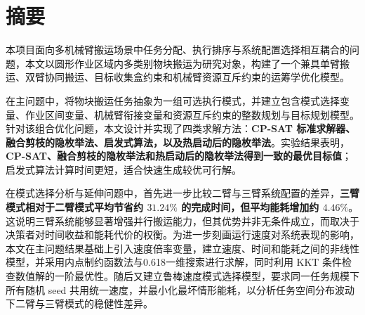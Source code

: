 \section*{摘要}

本项目面向多机械臂搬运场景中任务分配、执行排序与系统配置选择相互耦合的问题，本文以圆形作业区域内多类别物块搬运为研究对象，构建了一个兼具单臂搬运、双臂协同搬运、目标收集盒约束和机械臂资源互斥约束的运筹学优化模型。

在主问题中，将物块搬运任务抽象为一组可选执行模式，并建立包含模式选择变量、作业区间变量、机械臂衔接变量和资源互斥约束的整数规划与目标规划模型。针对该组合优化问题，本文设计并实现了四类求解方法：\textbf{CP-SAT 标准求解器、融合剪枝的隐枚举法、启发式算法，以及热启动后的隐枚举法}。实验结果表明，\textbf{CP-SAT、融合剪枝的隐枚举法和热启动后的隐枚举法得到一致的最优目标值}；启发式算法计算时间更短，适合快速生成较优可行解。

在模式选择分析与延伸问题中，首先进一步比较二臂与三臂系统配置的差异，\textbf{三臂模式相对于二臂模式平均节省约 $31.24\%$ 的完成时间，但平均能耗增加约 $4.46\%$}。这说明三臂系统能够显著增强并行搬运能力，但其优势并非无条件成立，而取决于决策者对时间收益和能耗代价的权衡。为进一步刻画运行速度对系统表现的影响，本文在主问题结果基础上引入速度倍率变量，建立速度、时间和能耗之间的非线性模型，并采用内点制约函数法与0.618一维搜索进行求解，同时利用 KKT 条件检查数值解的一阶最优性。随后又建立鲁棒速度模式选择模型，要求同一任务规模下所有随机 seed 共用统一速度，并最小化最坏情形能耗，以分析任务空间分布波动下二臂与三臂模式的稳健性差异。

